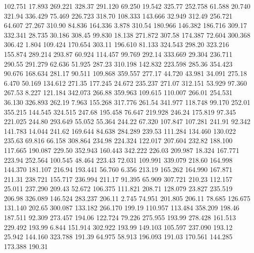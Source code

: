  102.751   17.893  269.221       328.37
 291.120   69.250   19.542       325.77
 252.758   61.588   20.740       321.94
 336.429   75.469  226.723       318.70
 108.333  143.666   32.949       312.49
 256.721   64.607   27.267       310.90
  84.836  164.336    3.878       310.54
 180.966  146.382  186.716       309.17
 332.341   28.735   30.186       308.45
  99.830   18.138  271.872       307.58
 174.387   72.604  300.368       306.42
   1.804  109.424  170.654       303.11
 196.610   81.133  324.543       298.20
 323.216  155.874  289.214       293.87
  60.924  114.457   99.769       292.14
 333.669   29.304  236.711       290.55
 291.279   62.636   51.925       287.23
 310.198  142.832  223.598       285.36
 354.423   90.676  168.634       281.17
  90.511  109.868  359.557       277.17
  44.720   43.981   34.091       275.18
   6.470   50.169  134.612       271.35
 177.245   24.672  235.237       271.07
 312.151   53.929   97.360       267.53
   8.227  121.184  342.073       266.88
 359.963  109.615  110.007       266.01
 254.531   36.130  326.893       262.19
   7.963  155.268  317.776       261.54
 341.977  118.748   99.170       252.01
 355.215  144.545  324.515       247.68
 195.458   76.647  219.928       246.24
 175.819   97.345  221.025       244.80
 293.649   55.052   55.364       244.22
  67.320  107.847  107.281       241.91
  92.342  141.783   14.044       241.62
 169.644   84.638  284.289       239.53
 111.284  134.460  130.022       235.63
  69.816   66.158  308.864       234.98
 224.324  122.017  207.604       232.82
 188.100  117.665  190.087       229.50
 352.943  160.443  342.222       226.03
 209.987   18.324  167.771       223.94
 252.564  100.545   48.464       223.43
  72.031  109.991  339.079       218.60
 164.998  144.370  181.107       216.94
 193.441   56.760    6.356       213.19
 165.262  164.990  167.871       211.31
 238.721  155.717  236.994       211.17
  91.395   65.909  307.721       210.23
 112.157   25.011  237.290       209.43
  52.672  106.375  111.821       208.71
 128.079   23.827  235.519       206.98
 326.089  146.524  283.237       206.11
   2.745   74.951  201.805       206.11
  78.685  126.675  131.140       202.65
 300.087  133.182  266.170       199.19
 110.957  113.484  358.209       198.46
 187.511   92.309  273.457       194.06
 122.724   79.226  275.955       193.99
 278.428  161.513  229.492       193.99
   6.844  151.914  302.922       193.99
 149.103  105.597  237.090       193.12
  25.942  144.160  323.788       191.39
  64.975   58.913  196.093       191.03
 170.561  144.285  173.388       190.31
